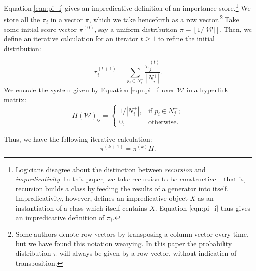 \documentclass[11pt,letterpaper]{amsart}
\newcommand{\iterate}[2]{#1^{(#2)}}
\begin{document}
Equation \eqref{eqn:pi_i} gives an impredicative definition of an importance
score.\footnote{Logicians disagree about the distinction between
  \textit{recursion} and \textit{impredicativity}. In this paper, we take
  recursion to be constructive -- that is, recursion builds a class by feeding
  the results of a generator into itself. Impredicativity, however, defines an
  impredicative object $X$ as an instantiation of a class which itself contains
  $X$. Equation \eqref{eqn:pi_i} thus gives an impredicative definition of
  $\pi_i$.} We store all the $\pi_i$ in a vector $\pi$, which we take henceforth
as a row vector.\footnote{Some authors denote row vectors by transposing a
  column vector every time, but we have found this notation wearying. In this
  paper the probability distribution $\pi$ will always be given by a row vector,
  without indication of transposition.} Take some initial score vector
$\iterate{\pi}{0}$, say a uniform distribution $\pi = [1/|\mathcal{W}|]$. Then,
we define an iterative calculation for an iterator $t\geq 1$ to refine the
initial distribution:

\begin{equation}
  \label{eqn:pi_t}
  \iterate{\pi}{t+1}_i = \sum_{p_j\in N^-_i}{\frac{\iterate{\pi}{t}_j}{|N^+_i|}}.
\end{equation}
We encode the system given by Equation \eqref{eqn:pi_i} over $\mathcal{W}$ in a hyperlink matrix:
\begin{equation*}
  H(\mathcal{W})_{ij}=\begin{cases}
    1/|N^+_i|, & \text{if } p_i \in N^-_j; \\
    0, & \text{otherwise}.
  \end{cases}
\end{equation*}

Thus, we have the following iterative calculation:
\begin{equation}
  \iterate{\pi}{k+1} = \iterate{\pi}{k} H.
\end{equation}
\end{document}
